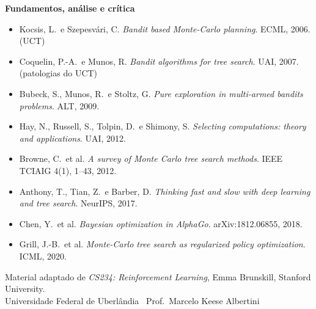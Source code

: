 \documentclass[11pt]{article}
\begin{document}
\textbf{Fundamentos, análise e crítica}
\begin{itemize}
  \item Kocsis, L.\ e Szepesvári, C. \emph{Bandit based Monte-Carlo planning}.
        ECML, 2006. \hfill (UCT)
  \item Coquelin, P.-A.\ e Munos, R. \emph{Bandit algorithms for tree search}.
        UAI, 2007. \hfill (patologias do UCT)
  \item Bubeck, S., Munos, R.\ e Stoltz, G. \emph{Pure exploration in multi-armed
        bandits problems}. ALT, 2009.
  \item Hay, N., Russell, S., Tolpin, D.\ e Shimony, S. \emph{Selecting
        computations: theory and applications}. UAI, 2012.
  \item Browne, C.\ et al. \emph{A survey of Monte Carlo tree search methods}.
        IEEE TCIAIG 4(1), 1--43, 2012.
  \item Anthony, T., Tian, Z.\ e Barber, D. \emph{Thinking fast and slow with deep
        learning and tree search}. NeurIPS, 2017.
  \item Chen, Y.\ et al. \emph{Bayesian optimization in AlphaGo}.
        arXiv:1812.06855, 2018.
  \item Grill, J.-B.\ et al. \emph{Monte-Carlo tree search as regularized policy
        optimization}. ICML, 2020.
\end{itemize}

\vfill
\begin{center}
\footnotesize\color{rlCinza}
Material adaptado de \emph{CS234: Reinforcement Learning}, Emma Brunskill,
Stanford University.\\
Universidade Federal de Uberlândia \textbullet\ Prof.\ Marcelo Keese Albertini
\end{center}
\end{document}
